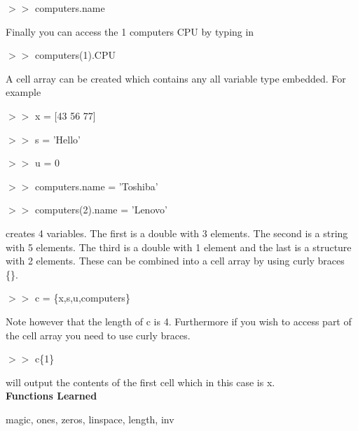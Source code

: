 \begin{enumerate}
$>>$ computers.name

Finally you can access the 1 computers CPU by typing in 

$>>$ computers(1).CPU

A cell array can be created which contains any all variable type
embedded. For example

$>>$ x = [43 56 77]

$>>$ s = 'Hello'

$>>$ u = 0

$>>$ computers.name = 'Toshiba'

$>>$ computers(2).name = 'Lenovo'

creates 4 variables. The first is a double with 3 elements. The second
is a string with 5 elements. The third is a double with 1 element and
the last is a structure with 2 elements. These can be combined into a
cell array by using curly braces \{\}.

$>>$ c = \{x,s,u,computers\}

Note however that the length of c is 4. Furthermore if you wish to
access part of the cell array you need to use curly braces.

$>>$ c\{1\}

will output the contents of the first cell which in this case is x.
\ \\

{\bf Functions Learned}

magic, ones, zeros, linspace, length, inv

\end{enumerate}
